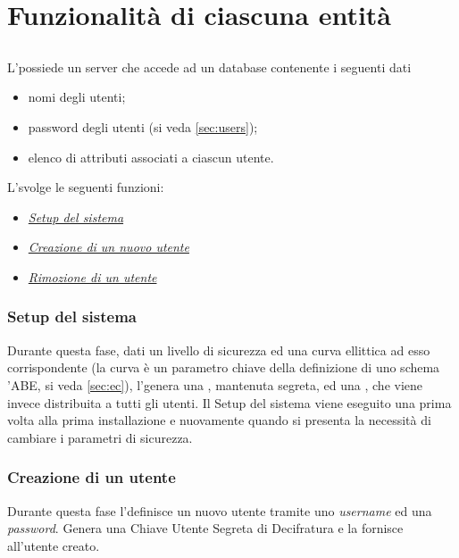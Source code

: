 \documentclass[a4paper,twoside,10pt,openany]{scrbook}
\begin{document}
\section{Funzionalità di ciascuna entità}\label{sec:funzionalita}
\subsection{\auth}\label{sec:funzionalita_authority}
L'\auth possiede un server che accede ad un database contenente i seguenti dati
\begin{itemize}\label{sec:auth_server}
 \item nomi degli utenti;
 \item password degli utenti (si veda \ref{sec:users});
 \item elenco di attributi associati a ciascun utente.
\end{itemize}
L'\auth svolge le seguenti funzioni:
\begin{itemize}
 \item \hyperref[sec:auth_setup]{\emph{Setup del sistema}}
 \item \hyperref[sec:auth_createuser]{\emph{Creazione di un nuovo utente}}
 \item \hyperref[sec:auth_deleteuser]{\emph{Rimozione di un utente}}
\end{itemize}
\subsubsection{Setup del sistema}\label{sec:auth_setup}
Durante questa fase, dati un livello di sicurezza ed una curva ellittica ad esso corrispondente (la curva è un parametro chiave della definizione di uno schema '\ac{ABE}, si veda \ref{sec:ec}), l'\auth genera una \abemk, mantenuta segreta, ed una \abepk, che viene invece distribuita a tutti gli utenti. Il Setup del sistema viene eseguito una prima volta alla prima installazione e nuovamente quando si presenta la necessità di cambiare i parametri di sicurezza.
\subsubsection{Creazione di un utente}\label{sec:auth_createuser}
Durante questa fase l'\auth definisce un nuovo utente tramite uno \emph{username} ed una \emph{password}. Genera una Chiave Utente Segreta di Decifratura e la fornisce all'utente creato.
\end{document}
